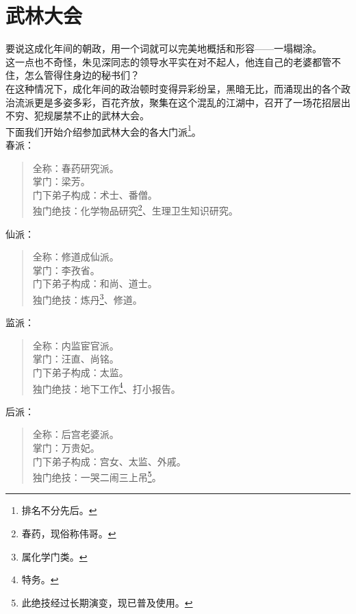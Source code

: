 \section{武林大会}
\ifnum{}
	\begin{multicols}{\theparacolNo}
\fi
要说这成化年间的朝政，用一个词就可以完美地概括和形容——一塌糊涂。\\

这一点也不奇怪，朱见深同志的领导水平实在对不起人，他连自己的老婆都管不住，怎么管得住身边的秘书们？\\

在这种情况下，成化年间的政治顿时变得异彩纷呈，黑暗无比，而涌现出的各个政治流派更是多姿多彩，百花齐放，聚集在这个混乱的江湖中，召开了一场花招层出不穷、犯规屡禁不止的武林大会。\\

下面我们开始介绍参加武林大会的各大门派\footnote{排名不分先后。}。\\

春派：
{\footnotesize \begin{quote}
	全称：春药研究派。\\
	掌门：梁芳。\\
	门下弟子构成：术士、番僧。\\
	独门绝技：化学物品研究\footnote{春药，现俗称伟哥。}、生理卫生知识研究。\\
\end{quote}}

仙派：
{\footnotesize \begin{quote}
	全称：修道成仙派。\\
	掌门：李孜省。\\
	门下弟子构成：和尚、道士。\\
	独门绝技：炼丹\footnote{属化学门类。}、修道。\\
\end{quote}}

监派：
{\footnotesize \begin{quote}
	全称：内监宦官派。\\
	掌门：汪直、尚铭。\\
	门下弟子构成：太监。\\
	独门绝技：地下工作\footnote{特务。}、打小报告。\\
\end{quote}}

后派：
{\footnotesize \begin{quote}
	全称：后宫老婆派。\\
	掌门：万贵妃。\\
	门下弟子构成：宫女、太监、外戚。\\
	独门绝技：一哭二闹三上吊\footnote{此绝技经过长期演变，现已普及使用。}。\\
\end{quote}}


\end{multicols}
